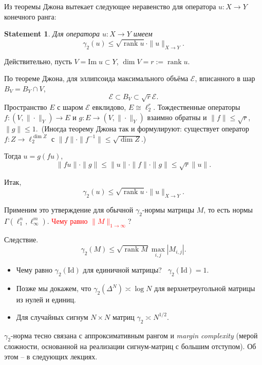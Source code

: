 \documentclass[handout]{beamer}
\renewcommand\le{\leqslant}
\newtheorem*{statement}{Statement}
\DeclareMathOperator{\rank}{rank}
\begin{document}
\begin{frame}

Из теоремы Джона вытекает следующее неравенство для оператора $u\colon
X\to Y$ конечного ранга:
    \begin{statement}
        Для оператора $u\colon X\to Y$ имеем
        $$
    \gamma_2(u)\le \sqrt{\rank u}\cdot \|u\|_{X\to Y}.
        $$
    \end{statement}
    \pause\vspace{5pt}

Действительно, пусть $V=\mathrm{Im}\;u\subset Y$, $\dim V=r:=\rank u$.
    \pause

    По теореме Джона, для эллипсоида максимального объёма $\mathcal E$,
    вписанного в шар $B_V=B_Y\cap V$,
    $$
    \mathcal E \subset B_V \subset \sqrt{r}\mathcal E.
    $$
    \pause\vspace{5pt}
    Пространство $E$ с шаром $\mathcal E$ евклидово, $E\cong\ell_2^r$.
    Тождественные операторы $f\colon (V,\|\cdot\|_Y) \to E$ и $g\colon
    E\to(V,\|\cdot\|_Y)$ взаимно обратны и $\|f\| \le \sqrt{r}$, $\|g\| \le
    1$.\pause~(Иногда теорему Джона так и формулируют: существует оператор
    $f\colon Z\to\ell_2^{\dim Z}$ с $\|f\|\cdot\|f^{-1}\|\le\sqrt{\dim Z}$.)
    \pause\vspace{5pt}

    Тогда $u=g(fu)$,
    $$
    \|fu\|\cdot \|g\|\le \|u\|\cdot\|f\|\cdot\|g\|\le \sqrt{r}\|u\|.
    $$

\end{frame}

\begin{frame}
    Итак,
        $$
    \gamma_2(u)\le \sqrt{\rank u}\cdot \|u\|_{X\to Y}.
        $$

    Применим это утверждение для обычной $\gamma_2$-нормы матрицы $M$, то есть
    нормы $\Gamma(\ell_1^n,\ell_\infty^m)$. \textcolor{red}{Чему
    равно $\|M\|_{1\to\infty}$}?
    \pause\vspace{5pt}

Следствие.
    $$
    \gamma_2(M) \le \sqrt{\rank M}\max\limits_{i,j}|M_{i,j}|.
    $$
    \pause\vspace{5pt}
    \begin{itemize}
        \item Чему равно $\gamma_2(\mathrm{Id})$ для единичной матрицы?
            \pause~$\gamma_2(\mathrm{Id})=1$.\pause
        \item Позже мы докажем, что $\gamma_2(\Delta^N)\asymp\log N$ для
            верхнетреугольной матрицы из нулей и единиц.
        \item Для случайных сигнум $N\times N$ матриц $\gamma_2\asymp N^{1/2}$.
    \end{itemize}
    \pause\vspace{5pt}

    $\gamma_2$-норма тесно связана с аппроксимативным рангом и \textit{margin
    complexity} (мерой сложности, основанной на реализации сигнум-матриц с
    большим отступом).  Об этом -- в следующих лекциях.

\end{frame}
\end{document}
